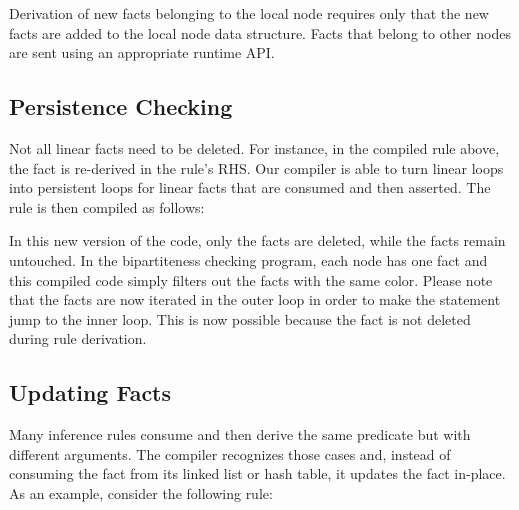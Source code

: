 Derivation of new facts belonging to the local node requires only that the new
facts are added to the local node data structure. Facts that belong to other
nodes are sent using an appropriate runtime API.

\subsection{Persistence Checking}

Not all linear facts need to be deleted. For instance, in the compiled rule
above, the fact  is re-derived in the rule's RHS.  Our
compiler is able to turn linear loops into persistent loops for linear facts
that are consumed and then asserted. The rule is then compiled as follows:


In this new version of the code, only the  facts are deleted, while
the  facts remain untouched. In the bipartiteness checking
program, each node has one  fact and this compiled code simply
filters out the  facts with the same color. Please note that the
 facts are now iterated in the outer loop in order to make the
 statement jump to the inner loop. This is now possible because the
 fact is not deleted during rule derivation.

\subsection{Updating Facts}

Many inference rules consume and then derive the same predicate but with
different arguments. The compiler recognizes those cases and, instead of
consuming the fact from its linked list or hash table, it updates the fact
in-place. As an example, consider the following rule:

